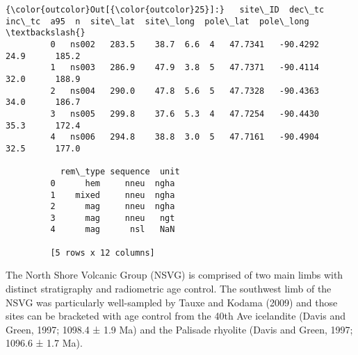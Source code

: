 \documentclass{article}
\begin{document}
            \begin{Verbatim}[commandchars=\\\{\}]
{\color{outcolor}Out[{\color{outcolor}25}]:}   site\_ID  dec\_tc  inc\_tc  a95  n  site\_lat  site\_long  pole\_lat  pole\_long  \textbackslash{}
         0   ns002   283.5    38.7  6.6  4   47.7341   -90.4292      24.9      185.2   
         1   ns003   286.9    47.9  3.8  5   47.7371   -90.4114      32.0      188.9   
         2   ns004   290.0    47.8  5.6  5   47.7328   -90.4363      34.0      186.7   
         3   ns005   299.8    37.6  5.3  4   47.7254   -90.4430      35.3      172.4   
         4   ns006   294.8    38.8  3.0  5   47.7161   -90.4904      32.5      177.0   
         
           rem\_type sequence  unit  
         0      hem     nneu  ngha  
         1    mixed     nneu  ngha  
         2      mag     nneu  ngha  
         3      mag     nneu   ngt  
         4      mag      nsl   NaN  
         
         [5 rows x 12 columns]
\end{Verbatim}
        
    The North Shore Volcanic Group (NSVG) is comprised of two main limbs
with distinct stratigraphy and radiometric age control. The southwest
limb of the NSVG was particularly well-sampled by Tauxe and Kodama
(2009) and those sites can be bracketed with age control from the 40th
Ave icelandite (Davis and Green, 1997; 1098.4 ± 1.9 Ma) and the Palisade
rhyolite (Davis and Green, 1997; 1096.6 ± 1.7 Ma).
\end{document}
